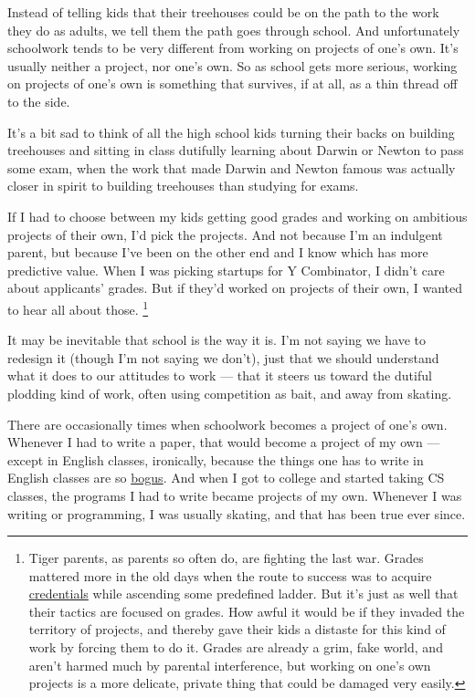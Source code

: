 Instead of telling kids that their treehouses could be on the path to
the work they do as adults, we tell them the path goes through school.
And unfortunately schoolwork tends to be very different from working on
projects of one's own. It's usually neither a project, nor one's own. So
as school gets more serious, working on projects of one's own is
something that survives, if at all, as a thin thread off to the side.

It's a bit sad to think of all the high school kids turning their backs
on building treehouses and sitting in class dutifully learning about
Darwin or Newton to pass some exam, when the work that made Darwin and
Newton famous was actually closer in spirit to building treehouses than
studying for exams.

If I had to choose between my kids getting good grades and working on
ambitious projects of their own, I'd pick the projects. And not because
I'm an indulgent parent, but because I've been on the other end and I
know which has more predictive value. When I was picking startups for Y
Combinator, I didn't care about applicants' grades. But if they'd worked
on projects of their own, I wanted to hear all about those.
\footnote{Tiger parents, as parents so often do, are fighting the last
war. Grades mattered more in the old days when the route to success was
to acquire \href{credentials.html}{credentials} while ascending some
predefined ladder. But it's just as well that their tactics are focused
on grades. How awful it would be if they invaded the territory of
projects, and thereby gave their kids a distaste for this kind of work
by forcing them to do it. Grades are already a grim, fake world, and
aren't harmed much by parental interference, but working on one's own
projects is a more delicate, private thing that could be damaged very
easily.}

It may be inevitable that school is the way it is. I'm not saying we
have to redesign it (though I'm not saying we don't), just that we
should understand what it does to our attitudes to work --- that it
steers us toward the dutiful plodding kind of work, often using
competition as bait, and away from skating.

There are occasionally times when schoolwork becomes a project of one's
own. Whenever I had to write a paper, that would become a project of my
own --- except in English classes, ironically, because the things one
has to write in English classes are so \href{essay.html}{bogus}. And
when I got to college and started taking CS classes, the programs I had
to write became projects of my own. Whenever I was writing or
programming, I was usually skating, and that has been true ever since.

